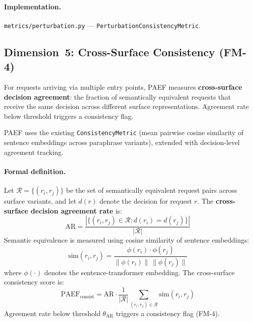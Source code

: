 \documentclass{article}
\begin{document}
\begin{sloppypar}\paragraph{Implementation.} \texttt{metrics/perturbation.py} ---
\texttt{Perturbation\-Consistency\-Metric}.\end{sloppypar}

\subsection{Dimension~5: Cross-Surface Consistency (FM-4)}
\label{sec:paef-consistency}

For requests arriving via multiple entry points, PAEF measures
\textbf{cross-surface decision agreement}: the fraction of semantically
equivalent requests that receive the same decision across different surface
representations.  Agreement rate below threshold triggers a consistency flag.

PAEF uses the existing \texttt{Consistency\allowbreak{}Metric} (mean pairwise cosine
similarity of sentence embeddings across paraphrase variants), extended with
decision-level agreement tracking.

\paragraph{Formal definition.}
Let $\mathcal{R} = \{(r_i, r_j)\}$ be the set of semantically equivalent request
pairs across surface variants, and let $d(r)$ denote the decision for request
$r$.  The \textbf{cross-surface decision agreement rate} is:
\begin{equation}
  \text{AR} = \frac{|\{(r_i, r_j) \in \mathcal{R} : d(r_i) = d(r_j)\}|}{|\mathcal{R}|}
\end{equation}
Semantic equivalence is measured using cosine similarity of sentence embeddings:
\begin{equation}
  \text{sim}(r_i, r_j) = \frac{\phi(r_i) \cdot \phi(r_j)}
                              {\|\phi(r_i)\|\,\|\phi(r_j)\|}
\end{equation}
where $\phi(\cdot)$ denotes the sentence-transformer embedding.  The
cross-surface consistency score is:
\begin{equation}
  \text{PAEF}_{\text{consist}} = \text{AR} \cdot
    \frac{1}{|\mathcal{R}|} \sum_{(r_i, r_j) \in \mathcal{R}} \text{sim}(r_i, r_j)
\end{equation}
Agreement rate below threshold $\theta_{\text{AR}}$ triggers a consistency flag (FM-4).
\end{document}
